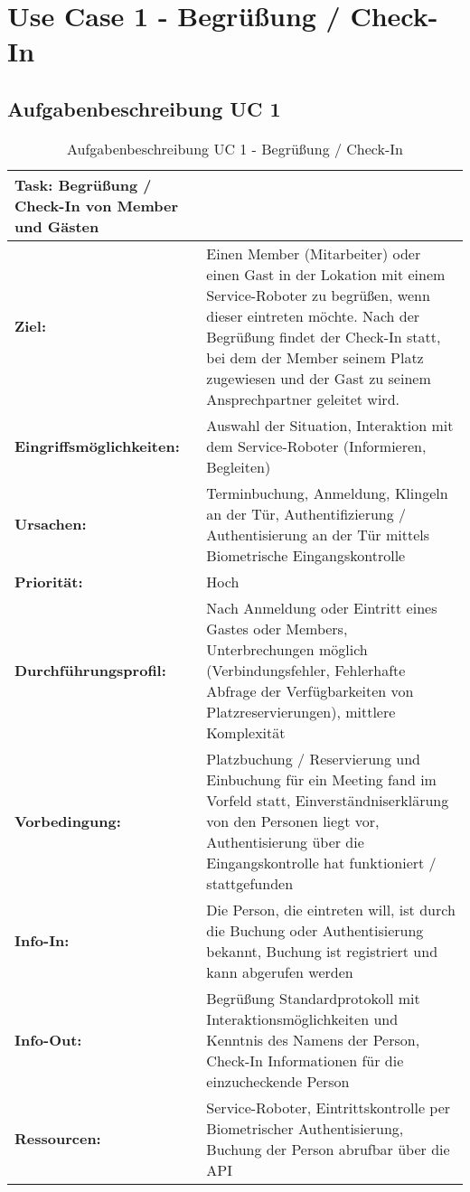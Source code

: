 \section*{Use Case 1 - Begrüßung / Check-In}
\subsection*{Aufgabenbeschreibung UC 1}
\begin{table}[hbt!]
    \begin{center}
        \begin{tabular}{| p{3cm} | p{12.75cm} | }
            \hline
                \textbf{Task: Begrüßung / Check-In von Member und Gästen} \\
            \hline
                \textbf{Ziel:} & Einen Member (Mitarbeiter) oder einen Gast in der Lokation mit einem Service-Roboter zu begrüßen, wenn dieser eintreten möchte. Nach der Begrüßung findet der Check-In statt, bei dem der Member seinem Platz zugewiesen und der Gast zu seinem Ansprechpartner geleitet wird. \\
            \hline
                \textbf{Eingriffsmöglichkeiten:} & Auswahl der Situation, Interaktion mit dem Service-Roboter (Informieren, Begleiten)  \\
            \hline
                \textbf{Ursachen:} & Terminbuchung, Anmeldung, Klingeln an der Tür, Authentifizierung / Authentisierung an der Tür mittels Biometrische Eingangskontrolle \\
            \hline
                \textbf{Priorität:} & Hoch \\
            \hline
                \textbf{Durchführungsprofil:} & Nach Anmeldung oder Eintritt eines Gastes oder Members, Unterbrechungen möglich (Verbindungsfehler, Fehlerhafte Abfrage der Verfügbarkeiten von Platzreservierungen), mittlere Komplexität \\ 
            \hline
                \textbf{Vorbedingung:} & Platzbuchung / Reservierung und Einbuchung für ein Meeting fand im Vorfeld statt, Einverständniserklärung von den Personen liegt vor, Authentisierung über die Eingangskontrolle hat funktioniert / stattgefunden \\
            \hline 
                \textbf{Info-In:} & Die Person, die eintreten will, ist durch die Buchung oder Authentisierung bekannt, Buchung ist registriert und kann abgerufen werden \\
            \hline
                \textbf{Info-Out:} & Begrüßung Standardprotokoll mit Interaktionsmöglichkeiten und Kenntnis des Namens der Person, Check-In Informationen für die einzucheckende Person \\
            \hline
                \textbf{Ressourcen:} & Service-Roboter, Eintrittskontrolle per Biometrischer Authentisierung, Buchung der Person abrufbar über die API \\
            \hline
        \end{tabular}
    \end{center}
    \caption{Aufgabenbeschreibung UC 1 - Begrüßung / Check-In}
    \label{tab:checkIn}
\end{table}

